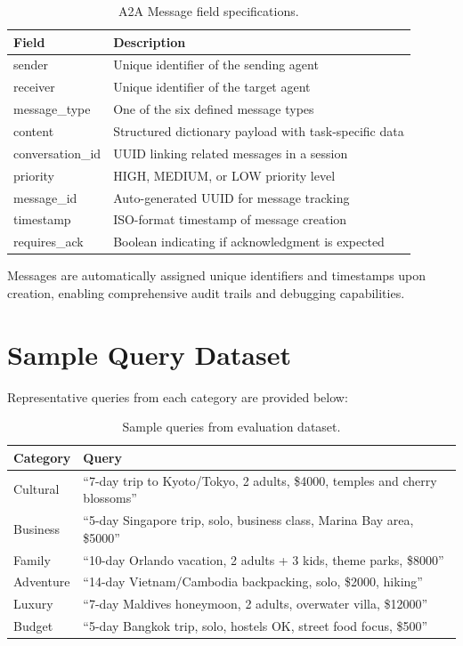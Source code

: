 \documentclass[preprint,review,12pt]{elsarticle}
\begin{document}
\begin{table}[h]
\centering
\small
\caption{A2A Message field specifications.}
\begin{tabular}{p{3cm}p{8cm}}
\toprule
\textbf{Field} & \textbf{Description} \\
\midrule
sender & Unique identifier of the sending agent \\
receiver & Unique identifier of the target agent \\
message\_type & One of the six defined message types \\
content & Structured dictionary payload with task-specific data \\
conversation\_id & UUID linking related messages in a session \\
priority & HIGH, MEDIUM, or LOW priority level \\
message\_id & Auto-generated UUID for message tracking \\
timestamp & ISO-format timestamp of message creation \\
requires\_ack & Boolean indicating if acknowledgment is expected \\
\bottomrule
\end{tabular}
\end{table}

Messages are automatically assigned unique identifiers and timestamps upon creation, enabling comprehensive audit trails and debugging capabilities.

\section{Sample Query Dataset}
\label{appendix:queries}

Representative queries from each category are provided below:

\begin{table}[h]
\centering
\small
\caption{Sample queries from evaluation dataset.}
\begin{tabular}{p{2cm}p{9cm}}
\toprule
\textbf{Category} & \textbf{Query} \\
\midrule
Cultural & ``7-day trip to Kyoto/Tokyo, 2 adults, \$4000, temples and cherry blossoms'' \\
Business & ``5-day Singapore trip, solo, business class, Marina Bay area, \$5000'' \\
Family & ``10-day Orlando vacation, 2 adults + 3 kids, theme parks, \$8000'' \\
Adventure & ``14-day Vietnam/Cambodia backpacking, solo, \$2000, hiking'' \\
Luxury & ``7-day Maldives honeymoon, 2 adults, overwater villa, \$12000'' \\
Budget & ``5-day Bangkok trip, solo, hostels OK, street food focus, \$500'' \\
\bottomrule
\end{tabular}
\end{table}
\end{document}
